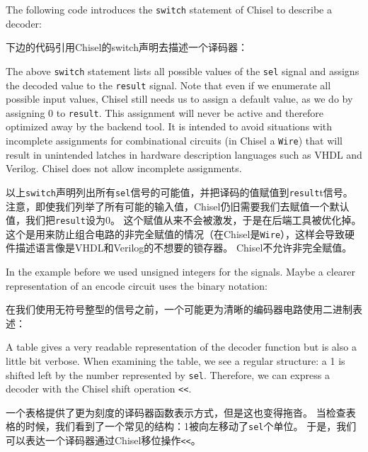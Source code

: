 \documentclass[%
    10pt,
    headinclude, footexclude,
    openright, %
    notitlepage,
    cleardoubleempty,
    headsepline,
    pointlessnumbers,
    bibtotoc, idxtotoc,
    ]{scrbook}
\newcommand{\code}[1]{{\small{\texttt{#1}}}}
\newcommand{\todo}[1]{{\emph{TODO: #1}}}
\renewcommand{\todo}[1]{}
\begin{document}

\noindent The following code introduces the \code{switch} statement of Chisel to describe a decoder:

下边的代码引用Chisel的switch声明去描述一个译码器：


\noindent The above \code{switch} statement lists all possible values of the \code{sel} signal
and assigns the decoded value to the \code{result} signal.
Note that even if we enumerate all possible input values, Chisel still needs us to assign a
default value, as we do by assigning 0 to \code{result}.
This assignment will never be active and therefore optimized away by the backend tool.
It is intended to avoid situations with incomplete assignments for combinational circuits
(in Chisel a \code{Wire}) that will result in unintended latches in hardware description
languages such as VHDL and Verilog. Chisel does not allow incomplete assignments.

以上\code{switch}声明列出所有\code{sel}信号的可能值，并把译码的值赋值到\code{result}t信号。
注意，即使我们列举了所有可能的输入值，Chisel仍旧需要我们去赋值一个默认值，我们把\code{result}设为0。
这个赋值从来不会被激发，于是在后端工具被优化掉。
这个是用来防止组合电路的非完全赋值的情况（在Chisel是\code{Wire}），这样会导致硬件描述语言像是VHDL和Verilog的不想要的锁存器。
Chisel不允许非完全赋值。

In the example before we used unsigned integers for the signals. Maybe a clearer representation
of an encode circuit uses the binary notation:

在我们使用无符号整型的信号之前，一个可能更为清晰的编码器电路使用二进制表述：


\todo{from Luca: for very small examples. What if the one-hot input is 256 wires? Can Chisel capture that? Or I need 256 lines? I would suggest to put an additional example. Maybe there is something like the for loop in VHDL.}

A table gives a very readable representation of the decoder function but is also
a little bit verbose.
When examining the table, we see a regular structure: a 1 is shifted left by the number
represented by \code{sel}. Therefore, we can express a decoder with the Chisel shift
operation \code{<<}.

一个表格提供了更为刻度的译码器函数表示方式，但是这也变得拖沓。
当检查表格的时候，我们看到了一个常见的结构：1被向左移动了\code{sel}个单位。
于是，我们可以表达一个译码器通过Chisel移位操作\code{<<}。
\end{document}

